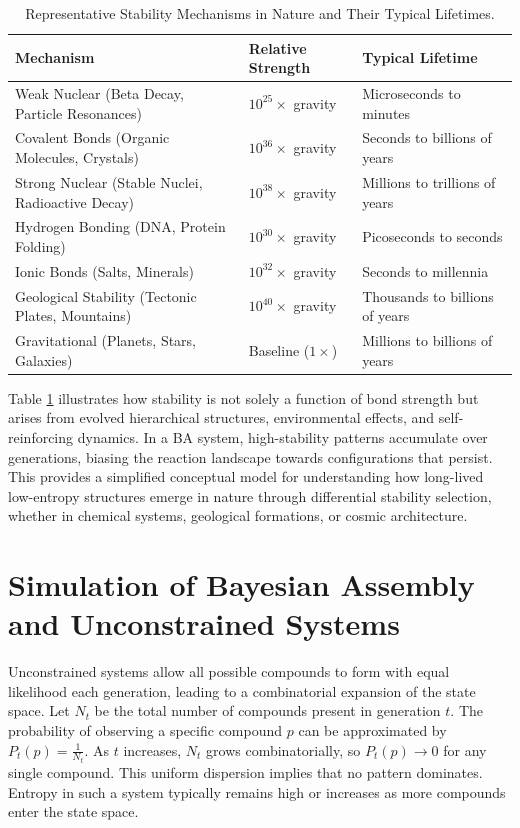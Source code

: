 \documentclass[entropy,article,submit,pdftex,moreauthors]{Definitions/mdpi}
\begin{document}
\begin{table}[H]
\centering
\caption{Representative Stability Mechanisms in Nature and Their Typical Lifetimes.}
\label{tab:binding-forces}
\begin{tabularx}{\textwidth}{>{\raggedright\arraybackslash}X >{\raggedright\arraybackslash}X >{\raggedright\arraybackslash}X}
\toprule
\textbf{Mechanism} & \textbf{Relative Strength} & \textbf{Typical Lifetime} \\
\midrule
Weak Nuclear (Beta Decay, Particle Resonances) & $10^{25}\times$ gravity & Microseconds to minutes \\
Covalent Bonds (Organic Molecules, Crystals) & $10^{36}\times$ gravity & Seconds to billions of years \\
Strong Nuclear (Stable Nuclei, Radioactive Decay) & $10^{38}\times$ gravity & Millions to trillions of years \\
Hydrogen Bonding (DNA, Protein Folding) & $10^{30}\times$ gravity & Picoseconds to seconds \\
Ionic Bonds (Salts, Minerals) & $10^{32}\times$ gravity & Seconds to millennia \\
Geological Stability (Tectonic Plates, Mountains) & $10^{40}\times$ gravity & Thousands to billions of years \\
Gravitational (Planets, Stars, Galaxies) & Baseline ($1\times$) & Millions to billions of years \\
\bottomrule
\end{tabularx}
\end{table}

Table \ref{tab:binding-forces} illustrates how stability is not solely a function of bond strength but arises from evolved hierarchical structures, environmental effects, and self-reinforcing dynamics. In a BA system, high-stability patterns accumulate over generations, biasing the reaction landscape towards configurations that persist. This provides a simplified conceptual model for understanding how long-lived low-entropy structures emerge in nature through differential stability selection, whether in chemical systems, geological formations, or cosmic architecture.

\section{Simulation of Bayesian Assembly and Unconstrained Systems}

Unconstrained systems allow all possible compounds to form with equal likelihood each generation, leading to a combinatorial expansion of the state space. Let $N_t$ be the total number of compounds present in generation $t$. The probability of observing a specific compound $p$ can be approximated by $P_t(p) = \frac{1}{N_t}$. As $t$ increases, $N_t$ grows combinatorially, so $P_t(p) \to 0$ for any single compound. This uniform dispersion implies that no pattern dominates. Entropy in such a system typically remains high or increases as more compounds enter the state space.
\end{document}
